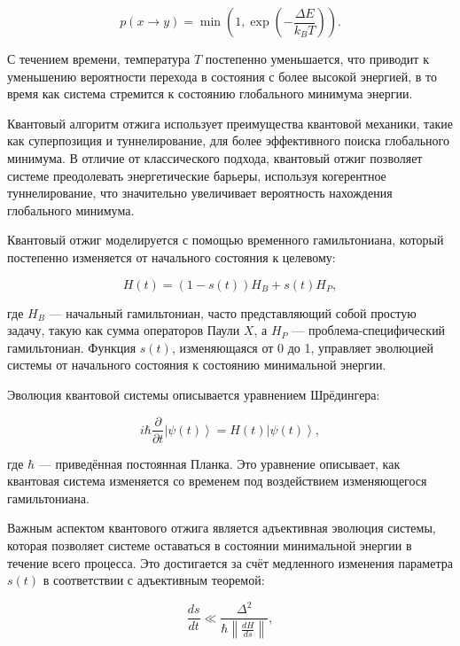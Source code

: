 \documentclass[a4paper]{report}
\newcommand{\ket}[1] {{\ensuremath{\left|#1\right\rangle}}}
\begin{document}
\begin{equation}
p(x \rightarrow y) = \min\left(1, \exp\left(-\frac{\Delta E}{k_B T}\right)\right).
\end{equation}

С течением времени, температура $T$ постепенно уменьшается, что приводит к уменьшению вероятности перехода в состояния с более высокой энергией, в то время как система стремится к состоянию глобального минимума энергии.

Квантовый алгоритм отжига использует преимущества квантовой механики, такие как суперпозиция и туннелирование, для более эффективного поиска глобального минимума. В отличие от классического подхода, квантовый отжиг позволяет системе преодолевать энергетические барьеры, используя когерентное туннелирование, что значительно увеличивает вероятность нахождения глобального минимума.

Квантовый отжиг моделируется с помощью временного гамильтониана, который постепенно изменяется от начального состояния к целевому:

\begin{equation}
H(t) = (1 - s(t)) H_B + s(t) H_P,
\end{equation}

где $H_B$ — начальный гамильтониан, часто представляющий собой простую задачу, такую как сумма операторов Паули $X$, а $H_P$ — проблема-специфический гамильтониан. Функция $s(t)$, изменяющаяся от 0 до 1, управляет эволюцией системы от начального состояния к состоянию минимальной энергии.

Эволюция квантовой системы описывается уравнением Шрёдингера:

\begin{equation}
i \hbar \frac{\partial}{\partial t} \ket{\psi(t)} = H(t) \ket{\psi(t)},
\end{equation}

где $\hbar$ — приведённая постоянная Планка. Это уравнение описывает, как квантовая система изменяется со временем под воздействием изменяющегося гамильтониана.

Важным аспектом квантового отжига является адъективная эволюция системы, которая позволяет системе оставаться в состоянии минимальной энергии в течение всего процесса. Это достигается за счёт медленного изменения параметра $s(t)$ в соответствии с адъективным теоремой:

\begin{equation}
\frac{ds}{dt} \ll \frac{\Delta^2}{\hbar \left\lVert \frac{dH}{ds} \right\rVert},
\end{equation}
\end{document}
